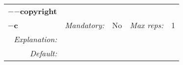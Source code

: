 \begin{center}\begin{tabular}{|rr|rl|rl|}
\hline
\multicolumn{2}{|l|}{\textbf{$-$$-$copyright}} & \multicolumn{4}{|l|}{} \\
\cline{3-6}
\multicolumn{2}{|l|}{\textbf{$-$c}} & \emph{Mandatory:} & No & \emph{Max reps:} & 1 \\
\hline
\emph{Explanation:} & \multicolumn{5}{|p{12cm}|}{} \\
\hline
\emph{Default:} & \multicolumn{5}{|p{12cm}|}{} \\
\hline
\end{tabular}\end{center}
